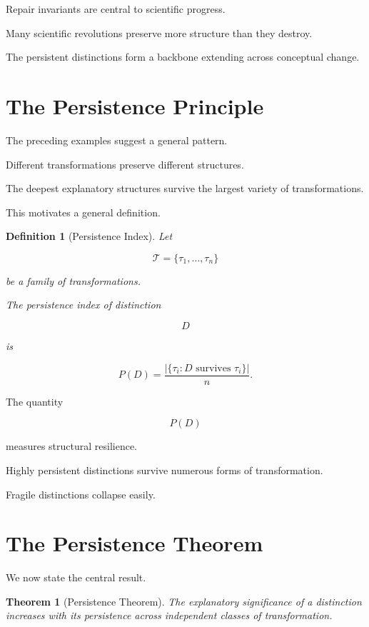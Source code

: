 \documentclass[11pt,oneside,openany]{book}
\newtheorem{definition}{Definition}[chapter] \newtheorem{theorem}{Theorem}[chapter] \newtheorem{proposition}{Proposition}[chapter] \newtheorem{lemma}{Lemma}[chapter] \newtheorem{corollary}{Corollary}[chapter] \newtheorem{remark}{Remark}[chapter]
\begin{document}
Repair invariants are central to scientific progress.

Many scientific revolutions preserve more structure than they destroy.

The persistent distinctions form a backbone extending across conceptual change.

\section{The Persistence Principle}

The preceding examples suggest a general pattern.

Different transformations preserve different structures.

The deepest explanatory structures survive the largest variety of transformations.

This motivates a general definition.

\begin{definition}[Persistence Index]

Let

\[
\mathcal T
=
\{
\tau_1,\ldots,\tau_n
\}
\]

be a family of transformations.

The persistence index of distinction

\[
D
\]

is

\[
P(D)
=
\frac{
|\{\tau_i:D \text{ survives } \tau_i\}|
}{
n
}.
\]

\end{definition}

The quantity

\[
P(D)
\]

measures structural resilience.

Highly persistent distinctions survive numerous forms of transformation.

Fragile distinctions collapse easily.

\section{The Persistence Theorem}

We now state the central result.

\begin{theorem}[Persistence Theorem]

The explanatory significance of a distinction increases with its persistence across independent classes of transformation.

\end{theorem}
\end{document}
